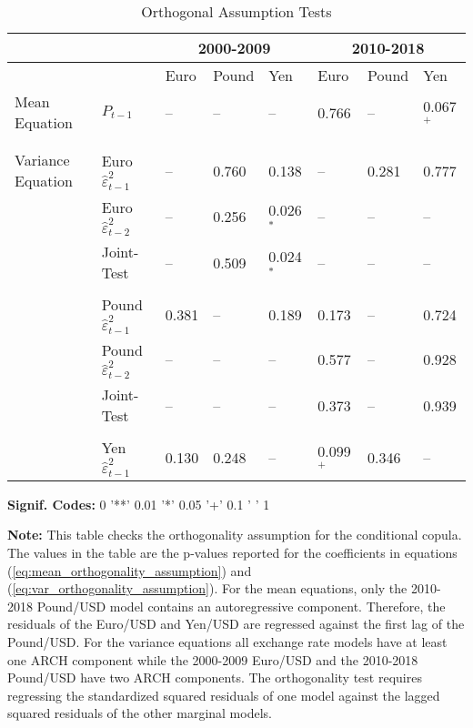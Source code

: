 \begin{table}
	\fontsize{10pt}{10pt}\selectfont
	\centering
	\caption{Orthogonal Assumption Tests} \label{tbl:Conditioning_Variable_Checks}
	\begin{threeparttable}
		\begin{tabular}{l l | l l l | l l l}
			\midrule
					& & \multicolumn{3}{c}{2000-2009} & \multicolumn{3}{c}{2010-2018} \\
			\midrule
					& & Euro & Pound & Yen & Euro & Pound & Yen \\
			\hline
			Mean Equation     & $P_{t-1}$                            & --    & --    & --          &  0.766       & --      & 0.067$^{+}$  \\ \\ \\
			Variance Equation & Euro $\hat{\varepsilon}^{2}_{t-1}$   & --    & 0.760 & 0.138       &  --          & 0.281   & 0.777        \\
							  & Euro $\hat{\varepsilon}^{2}_{t-2}$   & --    & 0.256 & 0.026$^{*}$ &  --          & --      & --           \\
							  & Joint-Test                           & --    & 0.509 & 0.024$^{*}$ &  --          & --      & --           \\ \\
							  & Pound $\hat{\varepsilon}^{2}_{t-1}$  & 0.381 & --    & 0.189       &  0.173       & --      & 0.724        \\
							  & Pound $\hat{\varepsilon}^{2}_{t-2}$  & --    & --    & --          &  0.577       & --      & 0.928        \\
							  & Joint-Test                           & --    & --    & --          &  0.373       & --      & 0.939        \\ \\
							  & Yen $\hat{\varepsilon}^{2}_{t-1}$    & 0.130 & 0.248 & --          &  0.099$^{+}$ & 0.346   & --           \\
		\hline
		\end{tabular}
		\begin{tablenotes}
			\item{\footnotesize \textbf{Signif. Codes:} 0 '**' 0.01 '*' 0.05 '+' 0.1 ' ' 1}
			\item{\footnotesize \textbf{Note:} This table checks the orthogonality assumption for the conditional copula. The values in the table are the p-values reported for the coefficients in equations (\ref{eq:mean_orthogonality_assumption}) and (\ref{eq:var_orthogonality_assumption}). For the mean equations, only the 2010-2018 Pound/USD model contains an autoregressive component. Therefore, the residuals of the Euro/USD and Yen/USD are regressed against the first lag of the Pound/USD. For the variance equations all exchange rate models have at least one ARCH component while the 2000-2009 Euro/USD and the 2010-2018 Pound/USD have two ARCH components. The orthogonality test requires regressing the standardized squared residuals of one model against the lagged squared residuals of the other marginal models.}

\end{tablenotes}
\end{threeparttable}
\end{table}
